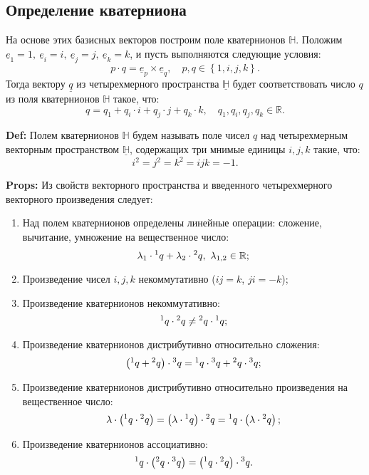 \documentclass[fleqn]{extarticle}
\newcommand{\pares}[1]{ \left( #1 \right) }
\newcommand{\bracs}[1]{ \left\lbrace #1 \right\rbrace }
\newcommand{\ue}{\underline{e}}
\newcommand{\pq}[1]{\prescript{#1}{}{q}}
\begin{document}
		\subsection{Определение кватерниона}

			На основе этих базисных векторов построим поле кватернионов $\mathbb{H}$. 
			Положим $\ue_1 = 1, ~ \ue_i = i, ~ \ue_j = j, ~ \ue_k = k$, 
			и пусть выполняются следующие условия:
			\[ p \cdot q = \ue_p \times \ue_q, \quad p, q \in \bracs{1, i, j, k}. \]
			Тогда вектору $\underline{q}$ из четырехмерного пространства $\mathbb{\underline{H}}$ будет соответствовать число $q$ из поля кватернионов $\mathbb{H}$ такое, что:
			\[ q = q_1 + q_i \cdot i + q_j \cdot j + q_k \cdot k, \quad q_1, q_i, q_j, q_k \in \mathbb{R}. \]

			\textbf{Def:} Полем кватернионов $\mathbb{H}$ будем называть поле чисел $q$ над четырехмерным векторным пространством $\mathbb{\underline{H}}$, содержащих три мнимые единицы $i, j, k$ такие, что:
			\[ i^2 = j^2 = k^2 = ijk = -1. \]

			\textbf{Props:} Из свойств векторного пространства и введенного четырехмерного векторного произведения следует:
			\begin{enumerate}
				\item Над полем кватернионов определены линейные операции: сложение, вычитание, умножение на вещественное число:
				\[ \lambda_1 \cdot \pq{1} + \lambda_2 \cdot \pq{2}, ~ \lambda_{1, 2} \in \mathbb{R}; \]
				\item Произведение чисел $i, j, k$ некоммутативно ($ij = k$, $ji = -k$);
				\item Произведение кватернионов некоммутативно:
				\[ \pq{1} \cdot \pq{2} \neq \pq{2} \cdot \pq{1}; \]
				\item Произведение кватернионов дистрибутивно относительно сложения:
				\[ \pares{\pq{1} + \pq{2}} \cdot \prescript{3}{}{q} = \pq{1} \cdot \prescript{3}{}{q} + \pq{2} \cdot \prescript{3}{}{q}; \]
				\item Произведение кватернионов дистрибутивно относительно произведения на вещественное число:
				\[ \lambda \cdot \pares{\pq{1} \cdot \pq{2}} = \pares{\lambda \cdot \pq{1}} \cdot \pq{2} = \pq{1} \cdot \pares{\lambda \cdot \pq{2}}; \]
				\item Произведение кватернионов ассоциативно:
				\[ \pq{1} \cdot \pares{\pq{2} \cdot \prescript{3}{}{q}} = \pares{\pq{1} \cdot \pq{2}} \cdot \prescript{3}{}{q}. \]
			\end{enumerate}
\end{document}
